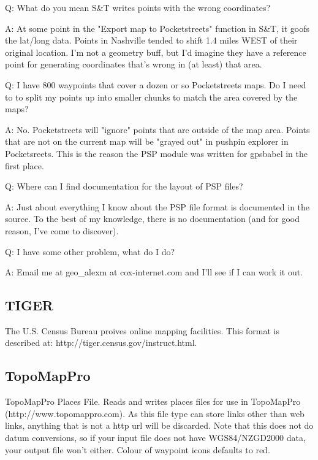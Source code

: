 \documentclass[12pt]{article}
\begin{document}
Q: What do you mean S\&T writes points with the wrong coordinates?

A: At some point in the "Export map to Pocketstreets" function in S\&T,
   it goofs the lat/long data.  Points in Nashville tended to shift
   1.4 miles WEST of their original location.  I'm not a geometry buff,
   but I'd imagine they have a reference point for generating coordinates
   that's wrong in (at least) that area.


Q: I have 800 waypoints that cover a dozen or so Pocketstreets maps.  
   Do I need to to split my points up into smaller chunks to match the 
   area covered by the maps?

A: No.  Pocketstreets will "ignore" points that are outside of the map
   area.  Points that are not on the current map will be "grayed out"
   in pushpin explorer in Pocketsreets.  This is the reason the PSP 
   module was written for gpsbabel in the first place.


Q: Where can I find documentation for the layout of PSP files?

A: Just about everything I know about the PSP file format is documented 
   in the source.  To the best of my knowledge, there is no documentation 
   (and for good reason, I've come to discover). 


Q: I have some other problem, what do I do?

A: Email me at geo\_alexm at cox-internet.com and I'll see if I can 
   work it out.



\subsection{TIGER}

	The U.S. Census Bureau proives online mapping facilities.  This
	format is described at: http://tiger.census.gov/instruct.html.



\subsection{TopoMapPro}

        TopoMapPro Places File.  Reads and writes places files for use
        in TopoMapPro (http://www.topomappro.com).  As this file type
        can store links other than web links, anything that is not a
        http url will be discarded.  Note that this does not do datum
        conversions, so if your input file does not have WGS84/NZGD2000
        data, your output file won't either.
        Colour of waypoint icons defaults to red.
\end{document}
